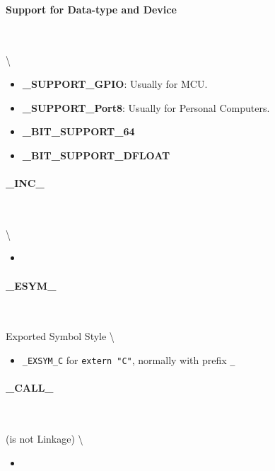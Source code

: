 \paragraph{Support for Data-type and Device} \

 \textbackslash{}

\begin{itemize}

\item \textbf{\_SUPPORT\_GPIO}: Usually for MCU.
\item \textbf{\_SUPPORT\_Port8}: Usually for Personal Computers.
\item \textbf{\_BIT\_SUPPORT\_64}
\item \textbf{\_BIT\_SUPPORT\_DFLOAT}
\end{itemize}



\paragraph{\_INC\_} \

 \textbackslash{}

\begin{itemize}

\item 
\end{itemize}



\paragraph{\_ESYM\_} \

 Exported Symbol Style \textbackslash{}

\begin{itemize}

\item \verb|_EXSYM_C| for \verb|extern "C"|, normally with prefix \verb|_|
\end{itemize}



\paragraph{\_CALL\_} \

 (is not Linkage) \textbackslash{}

\begin{itemize}

\item 
\end{itemize}



